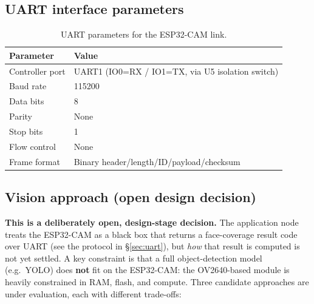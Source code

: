 \documentclass[11pt,a4paper]{article}
\begin{document}
\subsection{UART interface parameters}

\begin{table}[H]
    \centering
    \caption{UART parameters for the ESP32-CAM link.}
    \begin{tabular}{@{}ll@{}}
        \toprule
        \textbf{Parameter} & \textbf{Value} \\
        \midrule
        Controller port & UART1 (IO0=RX / IO1=TX, via U5 isolation switch) \\
        Baud rate & 115200 \\
        Data bits & 8 \\
        Parity & None \\
        Stop bits & 1 \\
        Flow control & None \\
        Frame format & Binary header/length/ID/payload/checksum \\
        \bottomrule
    \end{tabular}
\end{table}

\subsection{Vision approach (open design decision)}
\label{sec:vision}

\textbf{This is a deliberately open, design-stage decision.}  The application
node treats the ESP32-CAM as a black box that returns a face-coverage result
code over UART (see the protocol in \S\ref{sec:uart}), but \emph{how} that
result is computed is not yet settled.  A key constraint is that a full
object-detection model (e.g.\ YOLO) does \textbf{not} fit on the ESP32-CAM: the
OV2640-based module is heavily constrained in RAM, flash, and compute.  Three
candidate approaches are under evaluation, each with different trade-offs:
\end{document}
